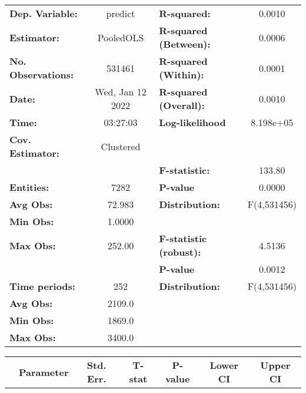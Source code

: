 \begin{center}
\begin{tabular}{lclc}
\toprule
\textbf{Dep. Variable:}    &      predict       & \textbf{  R-squared:         }   &      0.0010      \\
\textbf{Estimator:}        &     PooledOLS      & \textbf{  R-squared (Between):}  &      0.0006      \\
\textbf{No. Observations:} &       531461       & \textbf{  R-squared (Within):}   &      0.0001      \\
\textbf{Date:}             &  Wed, Jan 12 2022  & \textbf{  R-squared (Overall):}  &      0.0010      \\
\textbf{Time:}             &      03:27:03      & \textbf{  Log-likelihood     }   &    8.198e+05     \\
\textbf{Cov. Estimator:}   &     Clustered      & \textbf{                     }   &                  \\
\textbf{}                  &                    & \textbf{  F-statistic:       }   &      133.80      \\
\textbf{Entities:}         &        7282        & \textbf{  P-value            }   &      0.0000      \\
\textbf{Avg Obs:}          &       72.983       & \textbf{  Distribution:      }   &   F(4,531456)    \\
\textbf{Min Obs:}          &       1.0000       & \textbf{                     }   &                  \\
\textbf{Max Obs:}          &       252.00       & \textbf{  F-statistic (robust):} &      4.5136      \\
\textbf{}                  &                    & \textbf{  P-value            }   &      0.0012      \\
\textbf{Time periods:}     &        252         & \textbf{  Distribution:      }   &   F(4,531456)    \\
\textbf{Avg Obs:}          &       2109.0       & \textbf{                     }   &                  \\
\textbf{Min Obs:}          &       1869.0       & \textbf{                     }   &                  \\
\textbf{Max Obs:}          &       3400.0       & \textbf{                     }   &                  \\
\bottomrule
\end{tabular}
\begin{tabular}{lcccccc}
                & \textbf{Parameter} & \textbf{Std. Err.} & \textbf{T-stat} & \textbf{P-value} & \textbf{Lower CI} & \textbf{Upper CI}  \\

\end{tabular}
\end{center}
